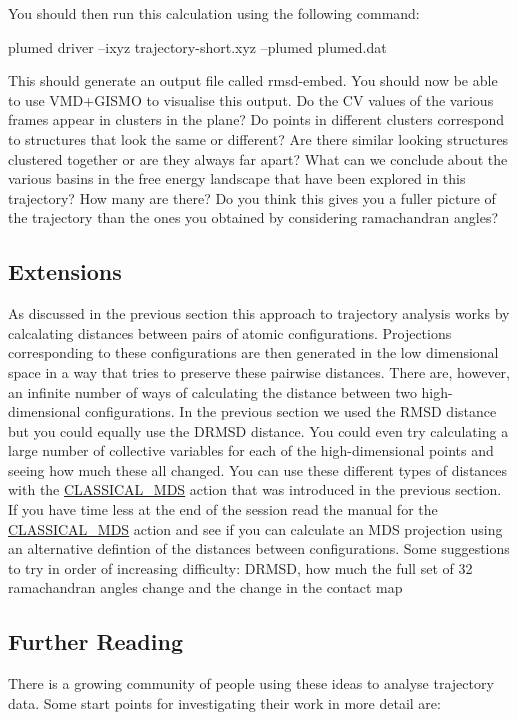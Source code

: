 You should then run this calculation using the following command\+:

\begin{DoxyVerb}plumed driver --ixyz trajectory-short.xyz --plumed plumed.dat
\end{DoxyVerb}


This should generate an output file called rmsd-\/embed. You should now be able to use V\+M\+D+\+G\+I\+S\+M\+O to visualise this output. Do the C\+V values of the various frames appear in clusters in the plane? Do points in different clusters correspond to structures that look the same or different? Are there similar looking structures clustered together or are they always far apart? What can we conclude about the various basins in the free energy landscape that have been explored in this trajectory? How many are there? Do you think this gives you a fuller picture of the trajectory than the ones you obtained by considering ramachandran angles?\hypertarget{belfast-3_extensions}{}\subsection{Extensions}\label{belfast-3_extensions}
As discussed in the previous section this approach to trajectory analysis works by calcalating distances between pairs of atomic configurations. Projections corresponding to these configurations are then generated in the low dimensional space in a way that tries to preserve these pairwise distances. There are, however, an infinite number of ways of calculating the distance between two high-\/dimensional configurations. In the previous section we used the R\+M\+S\+D distance but you could equally use the D\+R\+M\+S\+D distance. You could even try calculating a large number of collective variables for each of the high-\/dimensional points and seeing how much these all changed. You can use these different types of distances with the \hyperlink{CLASSICAL_MDS}{C\+L\+A\+S\+S\+I\+C\+A\+L\+\_\+\+M\+D\+S} action that was introduced in the previous section. If you have time less at the end of the session read the manual for the \hyperlink{CLASSICAL_MDS}{C\+L\+A\+S\+S\+I\+C\+A\+L\+\_\+\+M\+D\+S} action and see if you can calculate an M\+D\+S projection using an alternative defintion of the distances between configurations. Some suggestions to try in order of increasing difficulty\+: D\+R\+M\+S\+D, how much the full set of 32 ramachandran angles change and the change in the contact map\hypertarget{belfast-10_further}{}\subsection{Further Reading}\label{belfast-10_further}
There is a growing community of people using these ideas to analyse trajectory data. Some start points for investigating their work in more detail are\+:


